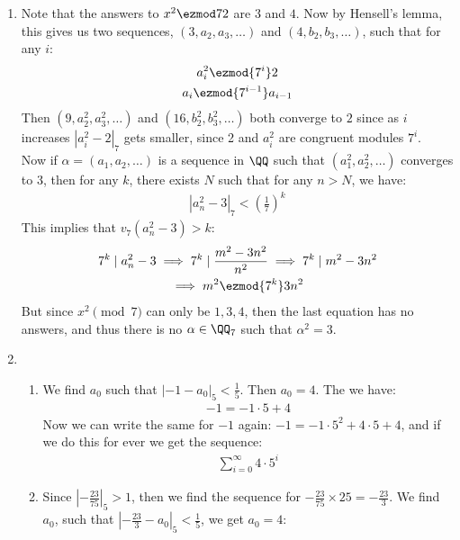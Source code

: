 \begin{enumerate}[label=\ilabel]
    \item  
        Note that the answers to $x^2 \ezmod 7 2$ are $3$ and $4$. Now by Hensell's lemma, this gives us two sequences, $(3, a_2, a_3, \dots)$ and $(4, b_2, b_3, \dots)$, such that for any $i$:
        \begin{gather*}
            a_i^2 \ezmod{7^i} 2 \\
            a_i \ezmod{7^{i - 1}} a_{i - 1}
        \end{gather*}
        Then $(9, a_2^2, a_3^2, \dots)$ and $(16, b_2^2, b_3^2, \dots)$ both converge to $2$ since as $i$ increases $|a_i^2 - 2|_7$ gets smaller, since 2 and $a_i^2$ are congruent modules $7^i$. \\
        Now if $\alpha = (a_1, a_2, \dots)$ is a sequence in $\QQ$ such that $(a_1^2, a_2^2, \dots)$ converges to $3$, then for any $k$, there exists $N$ such that for any $n > N$, we have:
        \begin{gather*}
            |a_n^2 - 3|_7 < (\frac{1}{7})^k
        \end{gather*}
        This implies that $v_7(a_n^2 - 3) > k$:
        \begin{gather*}
            7^k \mid a_n^2 - 3 \implies 7^k \mid \frac{m^2 - 3n^2}{n^2} \implies 7^k \mid m^2 - 3n^2 \\
            \implies m^2 \ezmod{7^k} 3n^2
        \end{gather*}
        But since $x^2 \pmod 7$ can only be $1, 3, 4$, then the last equation has no answers, and thus there is no $\alpha \in \QQ_7$ such that $\alpha^2 = 3$.
    \item
        \begin{enumerate}[label=\alph*)]
            \item 
                We find $a_0$ such that $|-1 - a_0|_5 < \frac{1}{5}$. Then $a_0 = 4$. The we have:
                \begin{gather*}
                    -1 = -1 \cdot 5 + 4
                \end{gather*}
                Now we can write the same for $-1$ again: $-1 = -1 \cdot 5^2 + 4 \cdot 5 + 4$, and if we do this for ever we get the sequence:
                \begin{gather*}
                    \sum_{i = 0}^\infty 4 \cdot 5^i
                \end{gather*}
            \item
                Since $|-\frac{23}{75}|_5 > 1$, then we find the sequence for $- \frac{23}{75} \times 25 = - \frac{23}{3}$. We find $a_0$, such that $|-\frac{23}{3} - a_0|_5 < \frac{1}{5}$, we get $a_0 = 4$:

\end{enumerate}
\end{enumerate}
